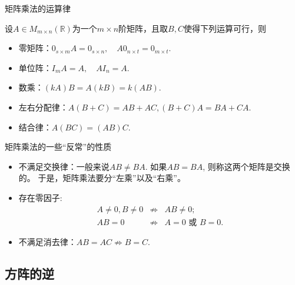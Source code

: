 
\begin{frame}{矩阵乘法的运算律}

设$A\in M_{m\times n}(\mathbb{R})$为一个$m\times n$阶矩阵，且取$B, C$使得下列运算可行，则
\begin{itemize}
\item 零矩阵：$0_{s\times m}A = 0_{s\times n}, \quad A0_{n\times t} = 0_{m\times t}$.
\item 单位阵：$I_mA = A, \quad AI_n = A$.
\item 数乘：$(kA)B = A(kB) = k(AB)$.
\item 左右分配律：$A(B+C) = AB + AC, (B+C)A = BA+CA$.
\item 结合律：$A(BC) = (AB)C$.
\end{itemize}

\end{frame}


\begin{frame}{矩阵乘法的一些``反常''的性质}

\begin{itemize}
\item 不满足交换律：一般来说$AB\neq BA$. 如果$AB = BA$, 则称这两个矩阵是交换的。\pause \newline
于是，矩阵乘法要分``左乘''以及``右乘''。\pause
\item 存在零因子:
\begin{eqnarray*}
A \neq 0, B \neq 0 & \not\Rightarrow & AB \neq 0; \\
AB = 0 & \not\Rightarrow & A = 0 \text{ 或 } B = 0.
\end{eqnarray*} \pause
\item 不满足消去律：$AB = AC \not\Rightarrow B = C$.
\end{itemize}

\end{frame}


\subsection{方阵的逆}

